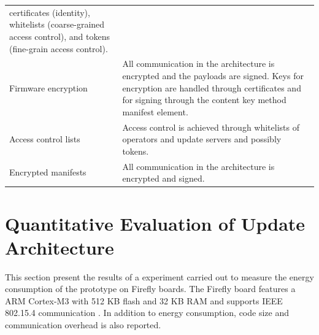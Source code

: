 \documentclass[0-thesis.tex]{subfiles}
\begin{document}
\begin{small}
\begin{longtable}[]{@{}ll@{}}
\begin{minipage}[t]{0.57\columnwidth}
    certificates (identity), whitelists (coarse-grained access control), and
    tokens (fine-grain access control).\strut
    \end{minipage}\tabularnewline
    \begin{minipage}[t]{0.37\columnwidth}\raggedright\strut
    Firmware encryption\strut
    \end{minipage} & \begin{minipage}[t]{0.57\columnwidth}\raggedright\strut
    All communication in the architecture is encrypted and the payloads are
    signed. Keys for encryption are handled through certificates and for
    signing through the content key method manifest element.\strut
    \end{minipage}\tabularnewline
    \begin{minipage}[t]{0.37\columnwidth}\raggedright\strut
    Access control lists\strut
    \end{minipage} & \begin{minipage}[t]{0.57\columnwidth}\raggedright\strut
    Access control is achieved through whitelists of operators and update
    servers and possibly tokens.\strut
    \end{minipage}\tabularnewline
    \begin{minipage}[t]{0.37\columnwidth}\raggedright\strut
    Encrypted manifests\strut
    \end{minipage} & \begin{minipage}[t]{0.57\columnwidth}\raggedright\strut
    All communication in the architecture is encrypted and signed.\strut
    \end{minipage}\tabularnewline
    \bottomrule
\end{longtable}
\end{small}

\section{Quantitative Evaluation of Update Architecture}
\label{sec:quant-evaluation}
This section present the results of a experiment carried out to measure the energy
consumption of the prototype on Firefly boards. The Firefly board features a ARM Cortex-M3
with 512 KB flash and 32 KB RAM and supports IEEE 802.15.4 communication
\parencite{firefly-datasheet}. In addition to energy consumption, code size and
communication overhead is also reported. 
\end{document}
